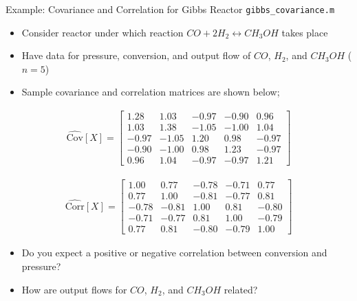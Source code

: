 \documentclass[handout,9pt]{beamer}
\begin{document}
%
\begin{frame}{Example: Covariance and Correlation for Gibbs Reactor \footnotesize{\texttt{gibbs\_covariance.m}}}

\begin{itemize}
\setlength{\itemsep}{3pt}
\item Consider reactor under which reaction $CO+2H_2\leftrightarrow CH_3OH$ takes place
\item Have data for pressure, conversion, and output flow of $CO$, $H_2$, and $CH_3OH$ ($n=5$)
\item Sample covariance and correlation matrices are shown below;
\end{itemize}

\begin{align*}
\hat{\textrm{Cov}}[X]=\left[\begin{array}{ccccc}
 		  1.28   &       1.03   &      -0.97    &     -0.90    &      0.96\\
          1.03     &     1.38    &     -1.05    &     -1.00    &      1.04\\
         -0.97      &   -1.05    &      1.20    &      0.98    &     -0.97\\
         -0.90   &      -1.00    &      0.98   &       1.23   &      -0.97\\
          0.96     &     1.04     &    -0.97    &     -0.97   &       1.21
\end{array}\right]
\end{align*}

\begin{align*}
\hat{\textrm{Corr}}[X]=\left[\begin{array}{ccccc}
1.00   &       0.77   &      -0.78   &      -0.71    &      0.77\\
          0.77    &      1.00    &     -0.81    &     -0.77    &      0.81\\
         -0.78   &      -0.81   &       1.00   &       0.81   &      -0.80\\
         -0.71    &     -0.77   &       0.81    &      1.00     &    -0.79\\
          0.77     &     0.81    &     -0.80    &     -0.79    &      1.00
\end{array}\right]
\end{align*}

\begin{block}{}
\begin{itemize}
\item Do you expect a positive or negative correlation between conversion and pressure?
 \item How are output flows for $CO$, $H_2$, and $CH_3OH$ related?
\end{itemize}
\end{block}

\end{frame}
\end{document}
